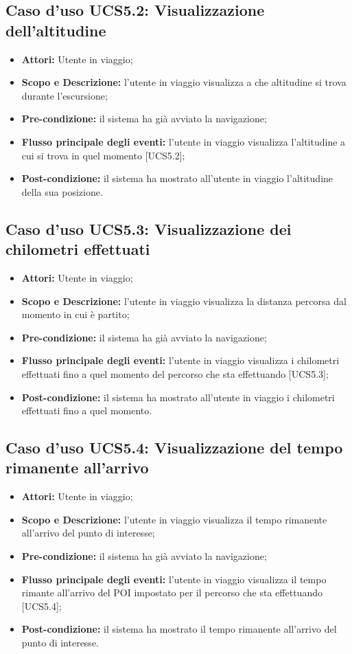 \subsection{Caso d'uso UCS5.2: Visualizzazione dell'altitudine}
\begin{itemize}
\item \textbf{Attori:} Utente in viaggio;
\item \textbf{Scopo e Descrizione:} l'utente in viaggio visualizza a che altitudine si trova durante l'escursione;
\item \textbf{Pre-condizione:} il sistema ha già avviato la navigazione;
\item \textbf{Flusso principale degli eventi:} l'utente in viaggio visualizza l'altitudine a cui si trova in quel momento [UCS5.2];
\item \textbf{Post-condizione:} il sistema ha mostrato all'utente in viaggio l'altitudine della sua posizione.
\end{itemize}

\subsection{Caso d'uso UCS5.3: Visualizzazione dei chilometri effettuati}
\begin{itemize}
\item \textbf{Attori:} Utente in viaggio;
\item \textbf{Scopo e Descrizione:} l'utente in viaggio visualizza la distanza percorsa dal momento in cui è partito;
\item \textbf{Pre-condizione:} il sistema ha già avviato la navigazione;
\item \textbf{Flusso principale degli eventi:} l'utente in viaggio visualizza i chilometri effettuati fino a quel momento del percorso che sta effettuando [UCS5.3];
\item \textbf{Post-condizione:} il sistema ha mostrato all'utente in viaggio i chilometri effettuati fino a quel momento.
\end{itemize}

\subsection{Caso d'uso UCS5.4: Visualizzazione del tempo rimanente all'arrivo}
\begin{itemize}
\item \textbf{Attori:} Utente in viaggio;
\item \textbf{Scopo e Descrizione:} l'utente in viaggio visualizza il tempo rimanente all'arrivo del punto di interesse;
\item \textbf{Pre-condizione:} il sistema ha già avviato la navigazione;
\item \textbf{Flusso principale degli eventi:} l'utente in viaggio visualizza il tempo rimante all'arrivo del POI impostato per il percorso che sta effettuando [UCS5.4];
\item \textbf{Post-condizione:} il sistema ha mostrato il tempo rimanente all'arrivo del punto di interesse.
\end{itemize}

